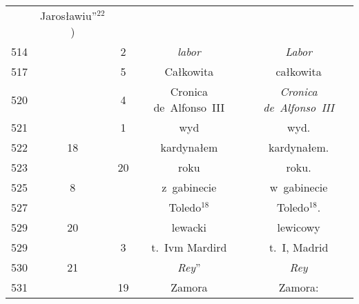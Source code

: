 \documentclass[a4paper,11pt]{article}
\begin{document}
\begin{center}
\begin{tabular}{|c|c|c|c|c|}
           & Jarosławiu''$^{ 22 }$) \\
    514 & &  2 & \emph{labor} & \emph{Labor} \\
    517 & &  5 & Całkowita & całkowita \\
    520 & &  4 & Cronica de~Alfonso~III & \emph{Cronica de~Alfonso~III} \\
    521 & &  1 & wyd & wyd. \\
    522 & 18 & & kardynałem & kardynałem. \\
    523 & & 20 & roku & roku. \\
    525 &  8 & & z~gabinecie & w~gabinecie \\
    527 & & & Toledo$^{ 18 }$\tb{.} & Toledo$^{ 18 }$. \\
    529 & 20 & & lewacki & lewicowy \\
    529 & &  3 & t.~Ivm Mardird & t.~I, Madrid \\
    530 & 21 & &  %
                 \emph{Rey}'' & \emph{Rey} \\
    531 & & 19 & Zamora\tb{:} & Zamora: \\
    \hline
  \end{tabular}


\end{center}
\end{document}
